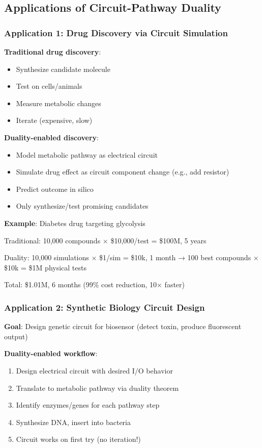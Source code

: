 \documentclass[11pt,a4paper]{article}
\begin{document}
\subsection{Applications of Circuit-Pathway Duality}

\subsubsection{Application 1: Drug Discovery via Circuit Simulation}

\textbf{Traditional drug discovery}:
\begin{itemize}
\item Synthesize candidate molecule
\item Test on cells/animals
\item Measure metabolic changes
\item Iterate (expensive, slow)
\end{itemize}

\textbf{Duality-enabled discovery}:
\begin{itemize}
\item Model metabolic pathway as electrical circuit
\item Simulate drug effect as circuit component change (e.g., add resistor)
\item Predict outcome in silico
\item Only synthesize/test promising candidates
\end{itemize}

\textbf{Example}: Diabetes drug targeting glycolysis

Traditional: 10,000 compounds $\times$ \$10,000/test = \$100M, 5 years

Duality: 10,000 simulations $\times$ \$1/sim = \$10k, 1 month → 100 best compounds $\times$ \$10k = \$1M physical tests

Total: \$1.01M, 6 months (99\% cost reduction, 10$\times$ faster)

\subsubsection{Application 2: Synthetic Biology Circuit Design}

\textbf{Goal}: Design genetic circuit for biosensor (detect toxin, produce fluorescent output)

\textbf{Duality-enabled workflow}:
\begin{enumerate}
\item Design electrical circuit with desired I/O behavior
\item Translate to metabolic pathway via duality theorem
\item Identify enzymes/genes for each pathway step
\item Synthesize DNA, insert into bacteria
\item Circuit works on first try (no iteration!)
\end{enumerate}
\end{document}
